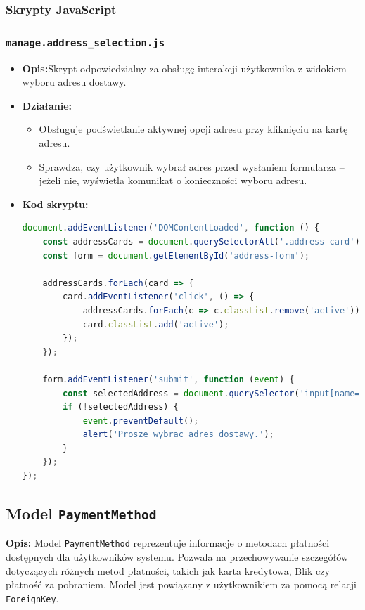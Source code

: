 \documentclass[12pt,a4paper,oneside]{article}
\theoremstyle{definition}
\numberwithin{equation}{section}
\begin{document}
\subsubsection{Skrypty JavaScript}

\subsubsection*{\texttt{manage.address\_selection.js}}
\begin{itemize}
    \item \textbf{Opis:}Skrypt odpowiedzialny za obsługę interakcji użytkownika z widokiem wyboru adresu dostawy.  
    \item \textbf{Działanie:}
        \begin{itemize}
            \item Obsługuje podświetlanie aktywnej opcji adresu przy kliknięciu na kartę adresu.
            \item Sprawdza, czy użytkownik wybrał adres przed wysłaniem formularza – jeżeli nie, wyświetla komunikat o konieczności wyboru adresu.
        \end{itemize}
    \item \textbf{Kod skryptu:}
\begin{lstlisting}[language=JavaScript, caption=Skrypt manage.address\_choice.js]
document.addEventListener('DOMContentLoaded', function () {
    const addressCards = document.querySelectorAll('.address-card');
    const form = document.getElementById('address-form');

    addressCards.forEach(card => {
        card.addEventListener('click', () => {
            addressCards.forEach(c => c.classList.remove('active'));
            card.classList.add('active');
        });
    });

    form.addEventListener('submit', function (event) {
        const selectedAddress = document.querySelector('input[name="selected_address"]:checked');
        if (!selectedAddress) {
            event.preventDefault();
            alert('Prosze wybrac adres dostawy.');
        }
    });
});
\end{lstlisting}
\end{itemize}


% 
% 
\subsection{Model \texttt{PaymentMethod}}

\textbf{Opis:}  
Model \texttt{PaymentMethod} reprezentuje informacje o metodach płatności dostępnych dla użytkowników systemu. Pozwala na przechowywanie szczegółów dotyczących różnych metod płatności, takich jak karta kredytowa, Blik czy płatność za pobraniem. Model jest powiązany z użytkownikiem za pomocą relacji \texttt{ForeignKey}.
\end{document}
